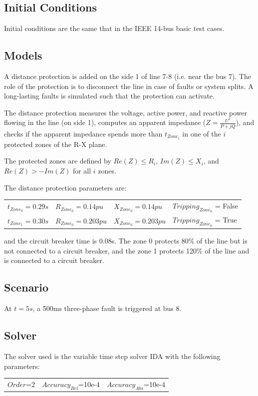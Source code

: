 \documentclass[a4paper, 12pt]{report}
\begin{document}
\subsection{Initial Conditions}

Initial conditions are the same that in the IEEE 14-bus basic test cases.

\subsection{Models}

A distance protection is added on the side 1 of line 7-8 (i.e. near the bus 7). The role of the protection is to disconnect the line in case of faults or system splits. A long-lasting faults is simulated such that the protection can activate.

The distance protection measures the voltage, active power, and reactive power flowing in the line (on side 1), computes an apparent impedance (\(Z = \frac{U^2}{P + jQ}\)), and checks if the apparent impedance spends more than \(t_{Zone_i}\) in one of the \(i\) protected zones of the R-X plane.

The protected zones are defined by \(Re(Z) \leq R_i\), \(Im(Z) \leq X_i\), and \(Re(Z) > -Im(Z)\)  for all \(i\) zones.


The distance protection parameters are:
\begin{center}
\begin{tabular}{l|l|l|l}
   $t_{Zone_0}=0.29s$ & $R_{Zone_0}=0.14pu$ & $X_{Zone_0}=0.14pu$ & $Tripping_{Zone_0}$ = False  \\
   $t_{Zone_1}=0.30s$ & $R_{Zone_0}=0.203pu$ & $X_{Zone_0}=0.203pu$ & $Tripping_{Zone_0}$ = True  \\
\end{tabular}
\end{center}
and the circuit breaker time is 0.08s. The zone 0 protects 80\% of the line but is not connected to a circuit breaker, and the zone 1 protects 120\% of the line and is connected to a circuit breaker.

\subsection{Scenario}
At $t=5s$, a 500ms three-phase fault is triggered at bus 8.

\subsection{Solver}
The solver used is the variable time step solver IDA with the following parameters:
\begin{center}
\begin{tabular}{l|l|l}
   $Order$=2 & $Accuracy_{Rel}$=10e-4 & $Accuracy_{Abs}$=10e-4 \\
\end{tabular}
\end{center}
\end{document}
